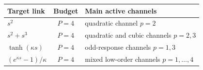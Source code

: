 \begin{tabular}{@{}lcl@{}}
\toprule
Target link & Budget & Main active channels \\
\midrule
$s^2$ & $P=4$ & quadratic channel $p=2$ \\
$s^2+s^3$ & $P=4$ & quadratic and cubic channels $p=2,3$ \\
$\tanh(\kappa s)$ & $P=4$ & odd-response channels $p=1,3$ \\
$(e^{\kappa s}-1)/\kappa$ & $P=4$ & mixed low-order channels $p=1,\ldots,4$ \\
\bottomrule
\end{tabular}
